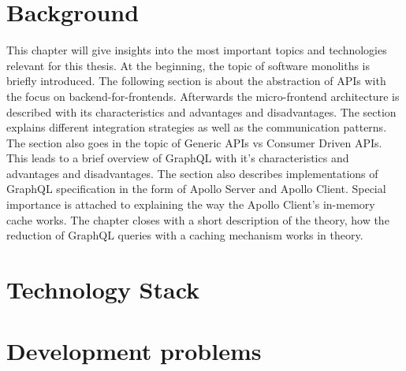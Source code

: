 \chapter{Background}

This chapter will give insights into the most important topics and technologies relevant for this thesis. At the beginning, the topic of software monoliths is briefly introduced. The following section is about the abstraction of APIs with the focus on backend-for-frontends. Afterwards the micro-frontend architecture is described with its characteristics and advantages and disadvantages. The section explains different integration strategies as well as the communication patterns. The section also goes in the topic of Generic APIs vs Consumer Driven APIs. This leads to a brief overview of GraphQL with it's characteristics and advantages and disadvantages. The section also describes implementations of GraphQL specification in the form of Apollo Server and Apollo Client. Special importance is attached to explaining the way the Apollo Client's in-memory cache works. The chapter closes with a short description of the theory, how the reduction of GraphQL queries with a caching mechanism works in theory.









\chapter{Technology Stack}

\chapter{Development problems}
